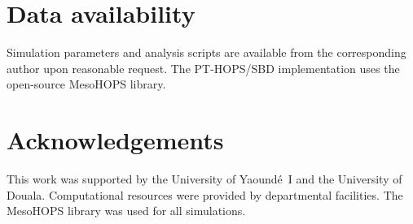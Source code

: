 \documentclass[11pt,a4paper]{article}
\begin{document}
\section*{Data availability}
Simulation parameters and analysis scripts are available from the corresponding author upon reasonable request. The PT-HOPS/SBD implementation uses the open-source MesoHOPS library.

\section*{Acknowledgements}
This work was supported by the University of Yaoundé~I and the University of Douala. Computational resources were provided by departmental facilities. The MesoHOPS library was used for all simulations.



\end{document}
